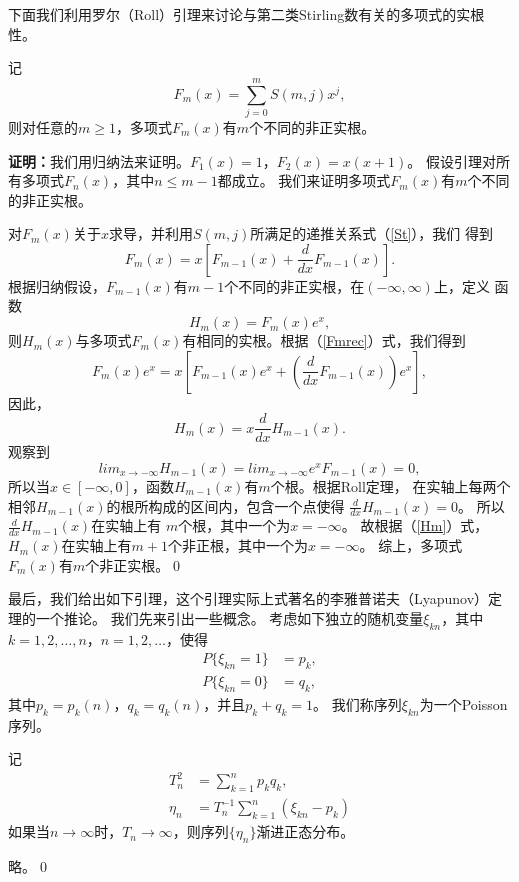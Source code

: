 下面我们利用罗尔（Roll）引理来讨论与第二类Stirling数有关的多项式的实根性。
\begin{lem}\label{Fmroot}
记
\begin{equation}
F_m(x)=\sum\limits_{j=0}^{m}S(m,j)x^j,
\end{equation}
则对任意的$m\geq 1$，多项式$F_m(x)$有$m$个不同的非正实根。
\end{lem}
\noindent
{\bf{证明：}}我们用归纳法来证明。$F_1(x)=1$，$F_2(x)=x(x+1)$。
假设引理对所有多项式$F_n(x)$，其中$n\leq m-1$都成立。
我们来证明多项式$F_m(x)$有$m$个不同的非正实根。

对$F_m(x)$关于$x$求导，并利用$S(m,j)$所满足的递推关系式（\ref{St}），我们
得到
\begin{equation}\label{Fmrec}
F_m(x)=x\left[F_{m-1}(x)+\frac{d}{dx}F_{m-1}(x)\right].
\end{equation}
根据归纳假设，$F_{m-1}(x)$有$m-1$个不同的非正实根，在$(-\infty,\infty)$上，定义
函数
\[
H_m(x)=F_m(x)e^x,
\]
则$H_m(x)$与多项式$F_m(x)$有相同的实根。根据（\ref{Fmrec}）式，我们得到
\[
F_m(x)e^x=x\left[F_{m-1}(x)e^x+\left(\frac{d}{dx}F_{m-1}(x)\right)e^x\right],
\]
因此，
\begin{equation}\label{Hm}
H_m(x)=x\frac{d}{dx}H_{m-1}(x).
\end{equation}
观察到
\[
lim_{x\rightarrow -\infty}H_{m-1}(x)=lim_{x\rightarrow
-\infty}e^xF_{m-1}(x)=0,
\]
所以当$x\in [-\infty,0]$，函数$H_{m-1}(x)$有$m$个根。根据Roll定理，
在实轴上每两个相邻$H_{m-1}(x)$的根所构成的区间内，包含一个点使得
$\frac{d}{dx}H_{m-1}(x)=0$。 所以$\frac{d}{dx}H_{m-1}(x)$在实轴上有
$m$个根，其中一个为$x=-\infty$。
故根据（\ref{Hm}）式，$H_m(x)$在实轴上有$m+1$个非正根，其中一个为$x=-\infty$。
综上，多项式$F_m(x)$有$m$个非正实根。\qed

最后，我们给出如下引理，这个引理实际上式著名的李雅普诺夫（Lyapunov）定理的一个推论。
我们先来引出一些概念。
考虑如下独立的随机变量$\xi_{kn}$，其中$k=1,2,\ldots,n$，$n=1,2,\ldots$，使得
\begin{align*}
P\{\xi_{kn}=1\}&=p_k,\\
P\{\xi_{kn}=0\}&=q_k,
\end{align*}
其中$p_k=p_k(n)$，$q_k=q_k(n)$，并且$p_k+q_k=1$。
我们称序列$\xi_{kn}$为一个Poisson序列。
\begin{lem}\label{Poissona}
记
\begin{align*}
T_n^2&=\sum\limits_{k=1}^{n}p_kq_k,\\
\eta_n&=T_n^{-1}\sum\limits_{k=1}^{n}(\xi_{kn}-p_k)
\end{align*}
如果当$n\rightarrow \infty$时，$T_n\rightarrow
\infty$，则序列$\{\eta_n\}$渐进正态分布。
\end{lem}
 略。\qed

